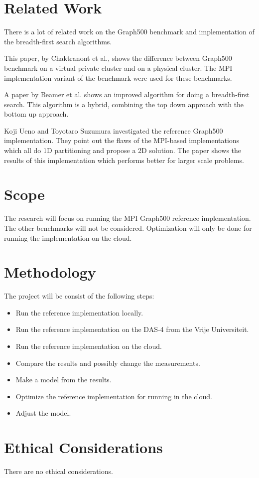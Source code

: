 \documentclass[A4]{scrartcl}
\begin{document}
\section*{Related Work}
There is a lot of related work on the Graph500 benchmark and implementation of the breadth-first search algorithms. 

This paper, by Chaktranont et al.\cite{chakthranont2014exploring}, shows the difference between Graph500 benchmark on a virtual private cluster and on a physical cluster. The MPI implementation variant of the benchmark were used for these benchmarks.

A paper by Beamer et al.\cite{beamer2011searching} shows an improved algorithm for doing a breadth-first search. This algorithm is a hybrid, combining the top down approach with the bottom up approach.

Koji Ueno and Toyotaro Suzumura\cite{ueno2012highly} investigated the reference Graph500 implementation. They point out the flaws of the MPI-based implementations which all do 1D partitioning and propose a 2D solution. The paper shows the results of this implementation which performs better for larger scale problems.

\section*{Scope}
The research will focus on running the MPI Graph500 reference implementation. The other benchmarks will not be considered. Optimization will only be done for running the implementation on the cloud.


\section*{Methodology}
The project will be consist of the following steps:
\begin{itemize}
\item Run the reference implementation locally.
\item Run the reference implementation on the DAS-4 from the Vrije Universiteit.
\item Run the reference implementation on the cloud.
\item Compare the results and possibly change the measurements.
\item Make a model from the results.
\item Optimize the reference implementation for running in the cloud.
\item Adjust the model.
\end{itemize}


\section*{Ethical Considerations}
There are no ethical considerations.

\printbibliography
\end{document}
